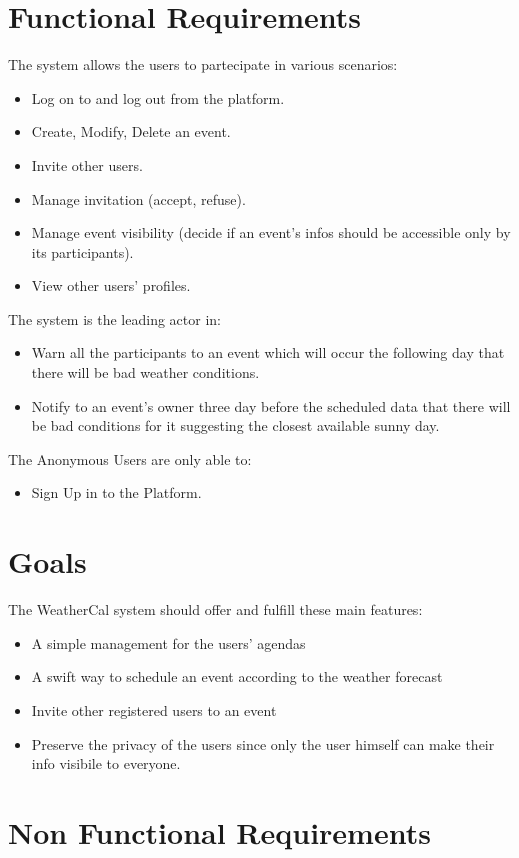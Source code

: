 \section{Functional Requirements}
The system allows the users to partecipate in various scenarios:
\begin{itemize}
\item Log on to and log out from the platform.
\item Create, Modify, Delete an event.
\item Invite other users.
\item Manage invitation (accept, refuse).
\item Manage event visibility (decide if an event's infos should be accessible only by its participants). 
\item View other users' profiles.
\end{itemize}
The system is the leading actor in:
\begin{itemize}
\item {Warn all the participants to an event which will occur the following day that there will be bad weather conditions.} 
\item Notify to an event's owner three day before the scheduled data that there will be bad conditions for it suggesting the closest available sunny day.
\end{itemize}
The Anonymous Users are only able to:
\begin{itemize}
\item Sign Up in to the Platform.
\end{itemize}
\section {Goals}
The WeatherCal system should offer and fulfill these main features:
\begin{itemize}
\item A simple management for the users' agendas
\item A swift way to schedule an event according to the weather forecast 
\item Invite other registered users to an event
\item Preserve the privacy of the users since only the user himself can make their info visibile to everyone.
\end{itemize}
\section{Non Functional Requirements}
